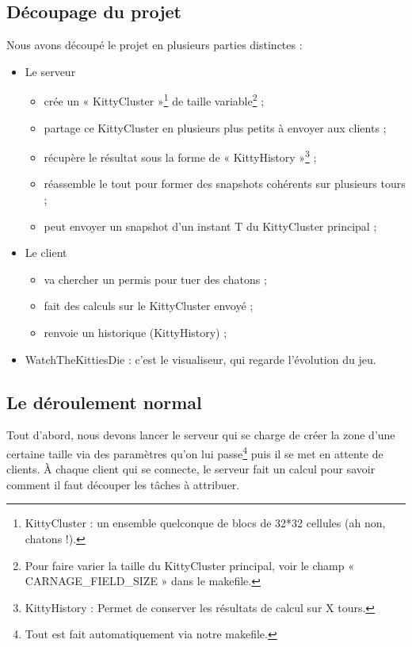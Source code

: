 \documentclass[twoside]{article}
\begin{document}
\subsection{Découpage du projet}
Nous avons découpé le projet en plusieurs parties distinctes : 
\begin{itemize}
	\item Le serveur 
		\begin{itemize}
			\item crée un « KittyCluster »\protect\footnote{
					KittyCluster : un ensemble quelconque de blocs de 32*32 cellules (ah non, chatons !).
				} de taille variable\protect\footnote{
					Pour faire varier la taille du KittyCluster principal, 
						 voir le champ « CARNAGE\_FIELD\_SIZE » dans le makefile.
				} ;
			\item partage ce KittyCluster en plusieurs plus petits à envoyer aux clients ;
			\item récupère le résultat sous la forme de « KittyHistory »\protect\footnote{
					KittyHistory : Permet de conserver les résultats de calcul sur X tours.
				}	;
			\item réassemble le tout pour former des snapshots cohérents sur plusieurs tours ;
			\item peut envoyer un snapshot d'un instant T du KittyCluster principal ;
		\end{itemize}
	\item Le client
		\begin{itemize}
			\item va chercher un permis pour tuer des chatons ;
			\item fait des calculs sur le KittyCluster envoyé ;
			\item renvoie un historique (KittyHistory) ;
		\end{itemize}
	\item WatchTheKittiesDie : c'est le visualiseur, qui regarde l'évolution du jeu.
\end{itemize}
\subsection{Le déroulement normal}
Tout d'abord, nous devons lancer le serveur qui se charge de créer la zone d'une certaine taille via des paramètres qu'on lui passe\protect\footnote{
Tout est fait automatiquement via notre makefile.
} puis il se met en attente de clients.
À chaque client qui se connecte, le serveur fait un calcul pour savoir comment il faut découper les tâches à attribuer.
\end{document}

